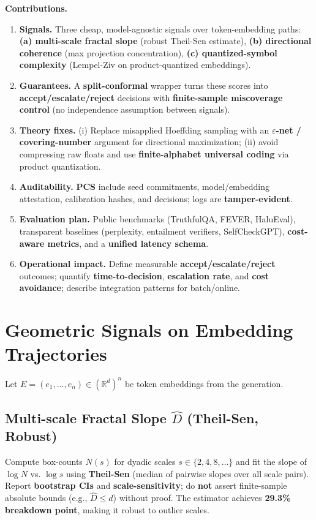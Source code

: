 \documentclass[11pt]{article}
\begin{document}
\textbf{Contributions.}
\begin{enumerate}
\item \textbf{Signals.} Three cheap, model-agnostic signals over token-embedding paths: \textbf{(a) multi-scale fractal slope} (robust Theil-Sen estimate), \textbf{(b) directional coherence} (max projection concentration), \textbf{(c) quantized-symbol complexity} (Lempel-Ziv on product-quantized embeddings).
\item \textbf{Guarantees.} A \textbf{split-conformal} wrapper turns these scores into \textbf{accept/escalate/reject} decisions with \textbf{finite-sample miscoverage control} (no independence assumption between signals).
\item \textbf{Theory fixes.} (i) Replace misapplied Hoeffding sampling with an \textbf{$\varepsilon$-net / covering-number} argument for directional maximization; (ii) avoid compressing raw floats and use \textbf{finite-alphabet universal coding} via product quantization.
\item \textbf{Auditability.} \textbf{PCS} include seed commitments, model/embedding attestation, calibration hashes, and decisions; logs are \textbf{tamper-evident}.
\item \textbf{Evaluation plan.} Public benchmarks (TruthfulQA, FEVER, HaluEval), transparent baselines (perplexity, entailment verifiers, SelfCheckGPT), \textbf{cost-aware metrics}, and a \textbf{unified latency schema}.
\item \textbf{Operational impact.} Define measurable \textbf{accept/escalate/reject} outcomes; quantify \textbf{time-to-decision}, \textbf{escalation rate}, and \textbf{cost avoidance}; describe integration patterns for batch/online.
\end{enumerate}

\section{Geometric Signals on Embedding Trajectories}
\label{sec:signals}

Let $E=(e_1,\dots,e_n)\in(\mathbb{R}^d)^n$ be token embeddings from the generation.

\subsection{Multi-scale Fractal Slope $\hat{D}$ (Theil-Sen, Robust)}
\label{sec:signal-dhat}

Compute box-counts $N(s)$ for dyadic scales $s\in\{2,4,8,\dots\}$ and fit the slope of $\log N$ vs. $\log s$ using \textbf{Theil-Sen} (median of pairwise slopes over all scale pairs). Report \textbf{bootstrap CIs} and \textbf{scale-sensitivity}; do \textbf{not} assert finite-sample absolute bounds (e.g., $\hat{D}\le d$) without proof. The estimator achieves \textbf{29.3\% breakdown point}, making it robust to outlier scales.
\end{document}
